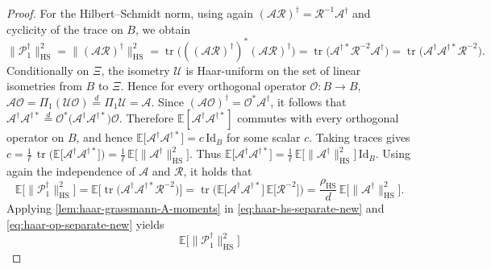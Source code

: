 \documentclass[final,onefignum,onetabnum]{siamart250211}
\begin{document}
\begin{proof}
  For the Hilbert--Schmidt norm, using again $(\mathcal A\mathcal R)^{\dagger}=\mathcal R^{-1}\mathcal A^{\dagger}$ and cyclicity of the trace on $B$, we obtain
  $
  \|\mathcal P_1^{\dagger}\|_{\mathrm{HS}}^{2}
  =
  \|(\mathcal A\mathcal R)^{\dagger}\|_{\mathrm{HS}}^{2} 
  =
  \operatorname{tr}\Big(((\mathcal A\mathcal R)^{\dagger})^{*}(\mathcal A\mathcal R)^{\dagger}\Big) 
  =
  \operatorname{tr}\big(\mathcal A^{\dagger *}\mathcal R^{-2}\mathcal A^{\dagger}\big) 
  =
  \operatorname{tr}\big(\mathcal A^{\dagger}\mathcal A^{\dagger *}\mathcal R^{-2}\big).
  $
  Conditionally on $\Xi$, the isometry $\mathcal U$ is Haar-uniform on the set of linear isometries from $B$ to $\Xi$.
  Hence for every orthogonal operator $\mathcal O:B\to B$,
  $
  \mathcal A\mathcal O
  =
  \Pi_1(\mathcal U\mathcal O)
  \stackrel{d}{=}
  \Pi_1\mathcal U
  =
  \mathcal A.
  $
  Since $(\mathcal A\mathcal O)^{\dagger}=\mathcal O^{*}\mathcal A^{\dagger}$, it follows that
  $
  \mathcal A^{\dagger}\mathcal A^{\dagger *}
  \stackrel{d}{=}
  \mathcal O^{*}\big(\mathcal A^{\dagger}\mathcal A^{\dagger *}\big)\mathcal O.
  $
  Therefore $\mathbb E[\mathcal A^{\dagger}\mathcal A^{\dagger *}]$ commutes with every orthogonal operator on $B$, and hence
  $
  \mathbb E\big[\mathcal A^{\dagger}\mathcal A^{\dagger *}\big]
  =
  c\,\mathrm{Id}_B
  $
  for some scalar $c$.
  Taking traces gives
  $
  c
  =
  \frac{1}{\ell}\,\operatorname{tr}\Big(\mathbb E\big[\mathcal A^{\dagger}\mathcal A^{\dagger *}\big]\Big)
  =
  \frac{1}{\ell}\,\mathbb E\big[\|\mathcal A^{\dagger}\|_{\mathrm{HS}}^{2}\big].
  $
  Thus
  $
  \mathbb E\big[\mathcal A^{\dagger}\mathcal A^{\dagger *}\big]
  =
  \frac{1}{\ell}\,\mathbb E\big[\|\mathcal A^{\dagger}\|_{\mathrm{HS}}^{2}\big]\,
  \mathrm{Id}_B.
  $
  Using again the independence of $\mathcal A$ and $\mathcal R$, it holds that
  \begin{equation}
    \label{eq:haar-hs-separate-new}
    \mathbb E\big[\|\mathcal P_1^{\dagger}\|_{\mathrm{HS}}^{2}\big]
    =
    \mathbb E\Big[\operatorname{tr}\big(\mathcal A^{\dagger}\mathcal A^{\dagger *}\mathcal R^{-2}\big)\Big] 
    =
    \operatorname{tr}\Big(
    \mathbb E\big[\mathcal A^{\dagger}\mathcal A^{\dagger *}\big]\,
    \mathbb E\big[\mathcal R^{-2}\big]
    \Big)
    =
    \frac{\rho_{\mathrm{HS}}}{d}\,\mathbb E\big[\|\mathcal A^{\dagger}\|_{\mathrm{HS}}^{2}\big].
  \end{equation}
  Applying \cref{lem:haar-grassmann-A-moments} in \eqref{eq:haar-hs-separate-new} and \eqref{eq:haar-op-separate-new} yields
  \[
  \mathbb E\big[\|\mathcal P_1^{\dagger}\|_{\mathrm{HS}}^{2}\big]
\]
\end{proof}
\end{document}
